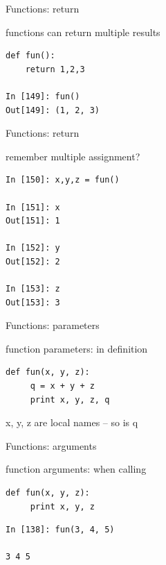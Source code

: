 \documentclass{beamer}
\begin{document}
\begin{frame}[fragile]{Functions: return}

{\Large functions can return multiple results}

\begin{verbatim}
def fun():
    return 1,2,3

In [149]: fun()
Out[149]: (1, 2, 3)
\end{verbatim}

\end{frame}

\begin{frame}[fragile]{Functions: return}

{\Large remember multiple assignment?}

\begin{verbatim}
In [150]: x,y,z = fun()

In [151]: x
Out[151]: 1

In [152]: y
Out[152]: 2

In [153]: z
Out[153]: 3
\end{verbatim}

\end{frame}









\begin{frame}[fragile]{Functions: parameters}

{\Large function parameters: in definition}

\begin{verbatim}
def fun(x, y, z):
     q = x + y + z
     print x, y, z, q
\end{verbatim}

{\Large x, y, z are local names -- so is q}

\end{frame}

\begin{frame}[fragile]{Functions: arguments}

{\Large function arguments: when calling}

\begin{verbatim}
def fun(x, y, z):
     print x, y, z
\end{verbatim}
\begin{verbatim}
In [138]: fun(3, 4, 5)

3 4 5
\end{verbatim}

\end{frame}
\end{document}
